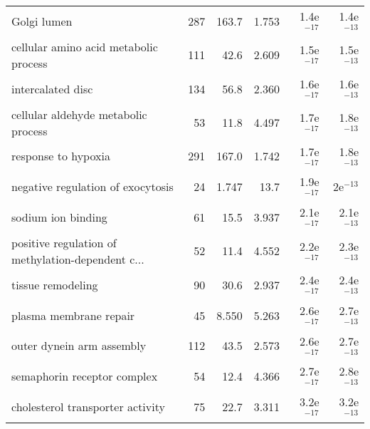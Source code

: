 \begin{longtable}{lrrrrr}
                                       Golgi lumen &                     287 &                   163.7 &      1.753 &         1.4e$^{-17}$ &         1.4e$^{-13}$ \\
             cellular amino acid metabolic process &                     111 &                    42.6 &      2.609 &         1.5e$^{-17}$ &         1.5e$^{-13}$ \\
                                 intercalated disc &                     134 &                    56.8 &      2.360 &         1.6e$^{-17}$ &         1.6e$^{-13}$ \\
               cellular aldehyde metabolic process &                      53 &                    11.8 &      4.497 &         1.7e$^{-17}$ &         1.8e$^{-13}$ \\
                               response to hypoxia &                     291 &                   167.0 &      1.742 &         1.7e$^{-17}$ &         1.8e$^{-13}$ \\
                 negative regulation of exocytosis &                      24 &                   1.747 &       13.7 &         1.9e$^{-17}$ &           2e$^{-13}$ \\
                                sodium ion binding &                      61 &                    15.5 &      3.937 &         2.1e$^{-17}$ &         2.1e$^{-13}$ \\
 positive regulation of methylation-dependent c... &                      52 &                    11.4 &      4.552 &         2.2e$^{-17}$ &         2.3e$^{-13}$ \\
                                 tissue remodeling &                      90 &                    30.6 &      2.937 &         2.4e$^{-17}$ &         2.4e$^{-13}$ \\
                            plasma membrane repair &                      45 &                   8.550 &      5.263 &         2.6e$^{-17}$ &         2.7e$^{-13}$ \\
                         outer dynein arm assembly &                     112 &                    43.5 &      2.573 &         2.6e$^{-17}$ &         2.7e$^{-13}$ \\
                       semaphorin receptor complex &                      54 &                    12.4 &      4.366 &         2.7e$^{-17}$ &         2.8e$^{-13}$ \\
                  cholesterol transporter activity &                      75 &                    22.7 &      3.311 &         3.2e$^{-17}$ &         3.2e$^{-13}$ \\

\end{longtable}
